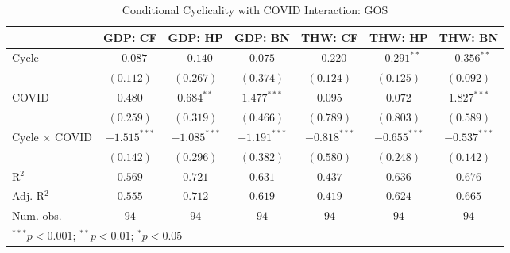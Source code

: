 
\usepackage{booktabs}

\begin{table}
\begin{center}
\begin{tabular}{l c c c c c c}
\toprule
 & GDP: CF & GDP: HP & GDP: BN & THW: CF & THW: HP & THW: BN \\
\midrule
Cycle                & $-0.087$       & $-0.140$       & $0.075$        & $-0.220$       & $-0.291^{**}$  & $-0.356^{**}$  \\
                     & $(0.112)$      & $(0.267)$      & $(0.374)$      & $(0.124)$      & $(0.125)$      & $(0.092)$      \\
COVID                & $0.480$        & $0.684^{**}$   & $1.477^{***}$  & $0.095$        & $0.072$        & $1.827^{***}$  \\
                     & $(0.259)$      & $(0.319)$      & $(0.466)$      & $(0.789)$      & $(0.803)$      & $(0.589)$      \\
Cycle $\times$ COVID & $-1.515^{***}$ & $-1.085^{***}$ & $-1.191^{***}$ & $-0.818^{***}$ & $-0.655^{***}$ & $-0.537^{***}$ \\
                     & $(0.142)$      & $(0.296)$      & $(0.382)$      & $(0.580)$      & $(0.248)$      & $(0.142)$      \\
\midrule
R$^2$                & $0.569$        & $0.721$        & $0.631$        & $0.437$        & $0.636$        & $0.676$        \\
Adj. R$^2$           & $0.555$        & $0.712$        & $0.619$        & $0.419$        & $0.624$        & $0.665$        \\
Num. obs.            & $94$           & $94$           & $94$           & $94$           & $94$           & $94$           \\
\bottomrule
\multicolumn{7}{l}{\scriptsize{$^{***}p<0.001$; $^{**}p<0.01$; $^{*}p<0.05$}}
\end{tabular}
\caption{Conditional Cyclicality with COVID Interaction: GOS}
\label{tab:gos_covid}
\end{center}
\end{table}
